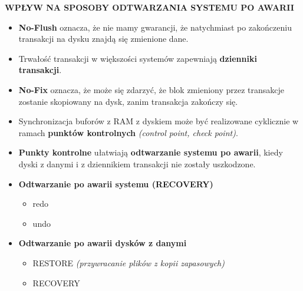 \textbf{WPŁYW NA SPOSOBY ODTWARZANIA SYSTEMU PO AWARII}
\begin{itemize}
    \item \textbf{No-Flush} oznacza, że nie mamy gwarancji, że natychmiast
    po zakończeniu transakcji na dysku znajdą się zmienione dane.
    \item Trwałość transakcji w większości systemów zapewniają
    \textbf{dzienniki transakcji}.
    \item \textbf{No-Fix} oznacza, że może się zdarzyć, że blok zmieniony
    przez transakcje zostanie skopiowany na dysk, zanim transakcja
    zakończy się.
    \item Synchronizacja buforów z RAM z dyskiem może być realizowane
    cyklicznie w ramach \textbf{punktów kontrolnych}
    \textit{(control point, check point)}.
    \item \textbf{Punkty kontrolne} ułatwiają \textbf{odtwarzanie systemu
    po awarii}, kiedy dyski z danymi i z dziennikiem transakcji nie
    zostały uszkodzone.

    \pagebreak

    \item \textbf{Odtwarzanie po awarii systemu (RECOVERY)}
    \begin{itemize}
        \item redo
        \item undo
    \end{itemize}

    \item \textbf{Odtwarzanie po awarii dysków z danymi}
    \begin{itemize}
        \item RESTORE \textit{(przywracanie plików z kopii zapasowych)}
        \item RECOVERY
    \end{itemize}
\end{itemize}

